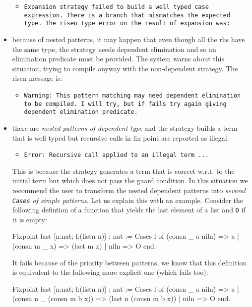 \begin{itemize}
  \begin{itemize}
  \item 
  {\tt Expansion strategy failed to build a well typed case expression.
  There is a branch that mismatches the expected type.
  The risen type error on the result of expansion was:}
  \end{itemize}

\item because of nested patterns, it may happen that even  though all
the rhs have  the same type, the strategy needs
dependent elimination and so an elimination predicate must be
provided. The system
warns about this situation, trying to compile anyway with the
non-dependent strategy. The risen message is:
\begin{itemize}
\item {\tt Warning: This pattern matching may need dependent elimination to be compiled.
I will try, but if fails try again giving dependent elimination predicate.}
\end{itemize}

\item there are {\em nested patterns of dependent type} and the strategy
builds a term that is well typed but recursive
calls in fix point are reported as illegal:
\begin{itemize}
\item {\tt Error: Recursive call applied to an illegal term ...}
\end{itemize}

This is because the strategy generates a term that is correct
w.r.t. to the initial term but which does  not pass the guard condition.
In this situation we recommend the user to transform the nested  dependent
patterns into {\em several \verb+Cases+ of simple patterns}.
Let us explain this with an example.
Consider the following defintion of a function that yields the last
element of a list and \verb+O+ if it is empty:

\begin{coq_example}
Fixpoint last [n:nat; l:(listn n)] : nat :=
Cases l of
    (consn _ a niln) => a
 |  (consn m _ x)    => (last m x)
 |   niln            => O
 end.
\end{coq_example}

It fails because of the priority between patterns, we know that this
definition is equivalent to the following more explicit one (which
fails too):

\begin{coq_example*}
Fixpoint last [n:nat; l:(listn n)] : nat :=
Cases l of
    (consn _ a niln)          => a
 |  (consn n _ (consn m b x)) => (last n (consn m b x))
 |   niln                     => O
 end.
\end{coq_example*}


\end{itemize}
